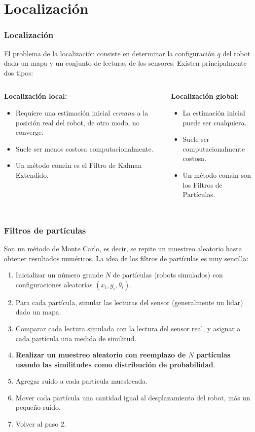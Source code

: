\documentclass[10pt,spanish,aspectratio=1610]{beamer}
\begin{document}
\section{Localización}
\begin{frame}\frametitle{Localización}
  El problema de la localización consiste en determinar la configuración $q$ del robot dada un mapa y un conjunto de lecturas de los sensores. Existen principalmente dos tipos:
  \[\]
  \begin{columns}
    \begin{column}{0.5\textwidth}
      \textbf{Localización local: }
      \begin{itemize}
      \item Requiere una estimación inicial \textit{cercana} a la posición real del robot, de otro modo, no converge.
      \item Suele ser menos costosa computacionalmente.
      \item Un método común es el Filtro de Kalman Extendido.
      \end{itemize}
    \end{column}
    \begin{column}{0.5\textwidth}
      \textbf{Localización global:}
      \begin{itemize}
      \item La estimación inicial puede ser cualquiera.
      \item Suele ser computacionalmente costosa.
      \item Un método común son los Filtros de Partículas. 
      \end{itemize}
      \[\]
      \[\]
    \end{column}
  \end{columns}
\end{frame}

\begin{frame}\frametitle{Filtros de partículas}
  Son un método de Monte Carlo, es decir, se repite un muestreo aleatorio hasta obtener resultados numéricos. La idea de los filtros de partículas es muy sencilla:
  \begin{enumerate}
  \item Inicializar un número grande $N$ de partículas (robots simulados) con configuraciones aleatorias $(x_i,y_i,\theta_i)$.
  \item Para cada partícula, simular las lecturas del sensor (generalmente un lidar) dado un mapa.
  \item Comparar cada lectura simulada con la lectura del sensor real, y asignar a cada partícula una medida de similitud.
  \item \textbf{Realizar un muestreo aleatorio con reemplazo de $N$ partículas usando las similitudes como distribución de probabilidad}.
  \item Agregar ruido a cada partícula muestreada.
  \item Mover cada partícula una cantidad igual al desplazamiento del robot, más un pequeño ruido.
  \item Volver al paso 2. 
  \end{enumerate}
\end{frame}
\end{document}
